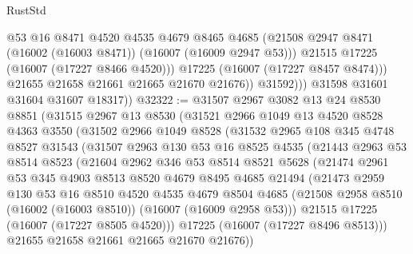 \begin{lexlean}{RustStd}
\begin{coremodule}
                      @53
                      @16
                      @8471
                      @4520
                      @4535
                      @4679
                      @8465
                      @4685
                      (@21508 @2947 @8471 (@16002 (@16003 @8471)) (@16007 (@16009 @2947 @53)))
                      @21515
                      @17225
                      (@16007 (@17227 @8466 @4520)))
                    @17225
                    (@16007 (@17227 @8457 @8474)))
                  @21655
                  @21658
                  @21661
                  @21665
                  @21670
                  @21676))
              @31592)))
        @31598
        @31601
        @31604
        @31607
        @18317))
@32322 := @31507
    @2967
    @3082
    @13
    @24
    @8530
    @8851
    (@31515
      @2967
      @13
      @8530
      (@31521
        @2966
        @1049
        @13
        @4520
        @8528
        @4363
        @3550
        (@31502
          @2966
          @1049
          @8528
          (@31532
            @2965
            @108
            @345
            @4748
            @8527
            @31543
            (@31507
              @2963
              @130
              @53
              @16
              @8525
              @4535
              (@21443
                @2963
                @53
                @8514
                @8523
                (@21604
                  @2962
                  @346
                  @53
                  @8514
                  @8521
                  @5628
                  (@21474
                    @2961
                    @53
                    @345
                    @4903
                    @8513
                    @8520
                    @4679
                    @8495
                    @4685
                    @21494
                    (@21473
                      @2959
                      @130
                      @53
                      @16
                      @8510
                      @4520
                      @4535
                      @4679
                      @8504
                      @4685
                      (@21508 @2958 @8510 (@16002 (@16003 @8510)) (@16007 (@16009 @2958 @53)))
                      @21515
                      @17225
                      (@16007 (@17227 @8505 @4520)))
                    @17225
                    (@16007 (@17227 @8496 @8513)))
                  @21655
                  @21658
                  @21661
                  @21665
                  @21670
                  @21676))

\end{coremodule}
\end{lexlean}
